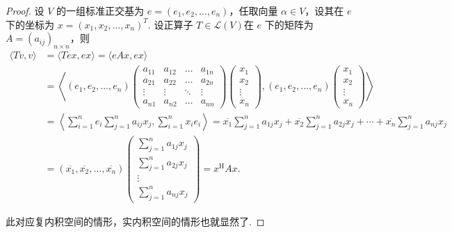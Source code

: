 \begin{proof}
    设 $ V $ 的一组标准正交基为 $ e = (e_1, e_2, \ldots, e_n) $，任取向量 $ \alpha \in V $，设其在 $ e $ 下的坐标为 $ x = (x_1, x_2, \ldots, x_n)^{T} $. 设正算子 $ T \in \mathcal{L}(V) $在 $ e $ 下的矩阵为 $ A = (a_{ij})_{n \times n}$，则
    \begin{align*}
        \langle Tv, v \rangle
         & = \langle Tex, ex \rangle = \langle eAx, ex \rangle                                                                                       \\
         & = \left\langle (e_1, e_2, \ldots ,e_n)
        \begin{pmatrix}
            a_{11} & a_{12} & \ldots & a_{1n} \\
            a_{21} & a_{22} & \ldots & a_{2n} \\
            \vdots & \vdots & \ddots & \vdots \\
            a_{n1} & a_{n2} & \ldots & a_{nn}
        \end{pmatrix}
        \begin{pmatrix}
            x_1    \\
            x_2    \\
            \vdots \\
            x_n
        \end{pmatrix} ,(e_1, e_2, \ldots ,e_n)
        \begin{pmatrix}
            x_1    \\
            x_2    \\
            \vdots \\
            x_n
        \end{pmatrix} \right\rangle                                                                                                                  \\
         & = \left\langle \sum_{i = 1}^{n}e_{i}\sum_{j = 1}^{n}a_{ij}x_{j}, \sum_{i = 1}^{n}x_{i}e_{i} \right\rangle
        = \overline{x_1}\sum_{j = 1}^{n}a_{1j}x_{j} + \overline{x_2}\sum_{j = 1}^{n}a_{2j}x_{j} + \cdots + \overline{x_n}\sum_{j = 1}^{n}a_{nj}x_{j} \\
         & = (\overline{x_1}, \overline{x_2}, \ldots, \overline{x_n})
        \begin{pmatrix}
            \sum\limits_{j = 1}^{n}a_{1j}x_{j} \\
            \sum\limits_{j = 1}^{n}a_{2j}x_{j} \\
            \vdots                             \\
            \sum\limits_{j = 1}^{n}a_{nj}x_{j}
        \end{pmatrix}
        = x^\mathrm{H}Ax.
    \end{align*}

    此对应复内积空间的情形，实内积空间的情形也就显然了.
\end{proof}

